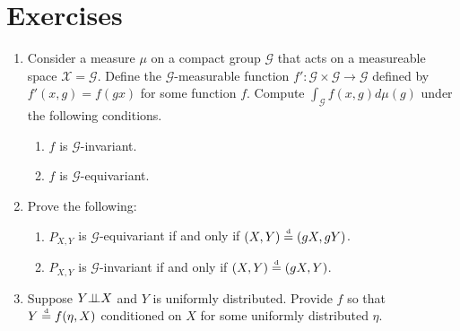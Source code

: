 

\section{Exercises}

\begin{enumerate}
	\item 
	Consider a measure $\mu$ on a compact group $\mathcal{G}$ that acts on a measureable space $\mathcal{X} = \mathcal{G}$.
	Define the $\mathcal{G}$-measurable function $f': \mathcal{G} \times \mathcal{G} \to \mathcal{G}$ defined by $f'(x,g) = f(gx)$ for some function $f$.
	Compute $\int_{\mathcal{G}} f(x,g) d\mu(g)$ under the following conditions.
	\begin{enumerate}[label=(\alph*)]
		\item
		$f$ is $\mathcal{G}$-invariant.
		
		\item $f$ is $\mathcal{G}$-equivariant.
	\end{enumerate}
	
	\item
	Prove the following:
	\begin{enumerate}[label=(\alph*)]
		\item
		$P_{X,Y}$ is $\mathcal{G}$-equivariant if and only if $(X,Y) \stackrel{\text{\rm\tiny d}}{=} (gX, gY)$.
		
		\item
		$P_{X,Y}$ is $\mathcal{G}$-invariant if and only if $(X,Y) \stackrel{\text{\rm\tiny d}}{=} (gX,Y)$.
	\end{enumerate}
	
	\item
	Suppose $Y {\perp\!\!\!\perp} X$ and $Y$ is uniformly distributed.
	Provide $f$ so that $Y \stackrel{\text{\rm\tiny d}}{=} f(\eta,X)$ conditioned on $X$ for some uniformly distributed $\eta$.
\end{enumerate}